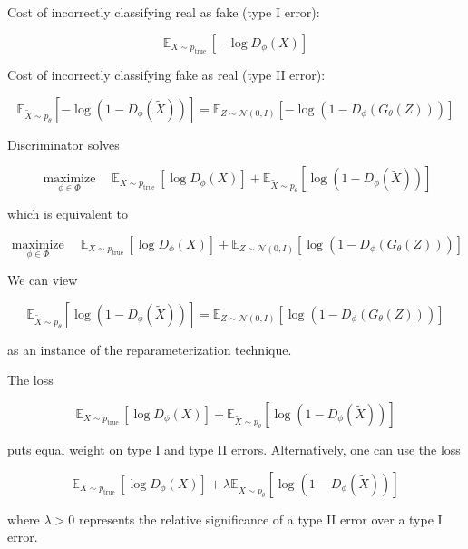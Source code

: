 \documentclass{report}
\begin{document}
\begin{concept}
    Cost of incorrectly classifying real as fake (type I error):

    $$
    \mathbb{E}_{X \sim p_{\text {true }}}\left[-\log D_{\phi}(X)\right]
    $$

    Cost of incorrectly classifying fake as real (type II error):

    $$
    \mathbb{E}_{\tilde{X} \sim p_{\theta}}\left[-\log \left(1-D_{\phi}(\tilde{X})\right)\right]=\mathbb{E}_{Z \sim \mathcal{N}(0, I)}\left[-\log \left(1-D_{\phi}\left(G_{\theta}(Z)\right)\right)\right]
    $$

    \par\noindent\textcolor{gray}{\hdashrule{\textwidth}{0.4pt}{1pt 2pt}}

    Discriminator solves

    $$
    \underset{\phi \in \Phi}{\operatorname{maximize}} \quad \mathbb{E}_{X \sim p_{\text {true }}}\left[\log D_{\phi}(X)\right]+\mathbb{E}_{\tilde{X} \sim p_{\theta}}\left[\log \left(1-D_{\phi}(\tilde{X})\right)\right]
    $$

    which is equivalent to

    $$
    \underset{\phi \in \Phi}{\operatorname{maximize}} \quad \mathbb{E}_{X \sim p_{\text {true }}}\left[\log D_{\phi}(X)\right]+\mathbb{E}_{Z \sim \mathcal{N}(0, I)}\left[\log \left(1-D_{\phi}\left(G_{\theta}(Z)\right)\right)\right]
    $$

    We can view

    $$
    \mathbb{E}_{\tilde{X} \sim p_{\theta}}\left[\log \left(1-D_{\phi}(\tilde{X})\right)\right]=\mathbb{E}_{Z \sim \mathcal{N}(0, I)}\left[\log \left(1-D_{\phi}\left(G_{\theta}(Z)\right)\right)\right]
    $$

    as an instance of the reparameterization technique.

    \par\noindent\textcolor{gray}{\hdashrule{\textwidth}{0.4pt}{1pt 2pt}}

    The loss

    $$
    \mathbb{E}_{X \sim p_{\text {true }}}\left[\log D_{\phi}(X)\right]+\mathbb{E}_{\tilde{X} \sim p_{\theta}}\left[\log \left(1-D_{\phi}(\tilde{X})\right)\right]
    $$

    puts equal weight on type I and type II errors. Alternatively, one can use the loss

    $$
    \mathbb{E}_{X \sim p_{\text {true }}}\left[\log D_{\phi}(X)\right]+\lambda \mathbb{E}_{\tilde{X} \sim p_{\theta}}\left[\log \left(1-D_{\phi}(\tilde{X})\right)\right]
    $$

    where $\lambda>0$ represents the relative significance of a type II error over a type I error.
\end{concept}
\end{document}
